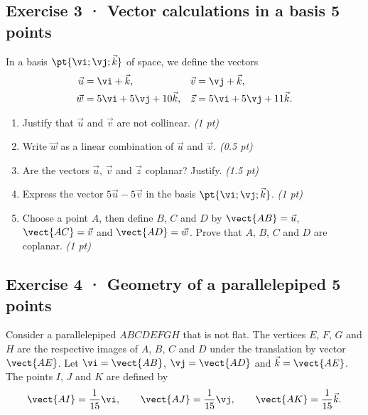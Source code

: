 \mxnewpage{}

\subsection*{Exercise 3 · Vector calculations in a basis \hfill 5 points}In a basis $\pt{\vi;\vj;\vec k}$ of space, we define the vectors
\[\begin{aligned}\vec u&=\vi+\vec k,&\vec v&=\vj+\vec k,\\
\vec w&=5\vi+5\vj+10\vec k,&\vec z&=5\vi+5\vj+11\vec k.\end{aligned}\]

\begin{enumerate}

\item Justify that $\vec u$ and $\vec v$ are not collinear. \hfill\textit{(1 pt)}

\item Write $\vec w$ as a linear combination of $\vec u$ and $\vec v$. \hfill\textit{(0.5 pt)}

\item Are the vectors $\vec u$, $\vec v$ and $\vec z$ coplanar? Justify. \hfill\textit{(1.5 pt)}

\item Express the vector $5\vec u-5\vec v$ in the basis $\pt{\vi;\vj;\vec k}$. \hfill\textit{(1 pt)}

\item Choose a point $A$, then define $B$, $C$ and $D$ by $\vect{AB}=\vec u$, $\vect{AC}=\vec v$ and $\vect{AD}=\vec w$. Prove that $A$, $B$, $C$ and $D$ are coplanar. \hfill\textit{(1 pt)}

\end{enumerate}

\subsection*{Exercise 4 · Geometry of a parallelepiped \hfill 5 points}Consider a parallelepiped $ABCDEFGH$ that is not flat. The vertices $E$, $F$, $G$ and $H$ are the respective images of $A$, $B$, $C$ and $D$ under the translation by vector $\vect{AE}$.
Let $\vi=\vect{AB}$, $\vj=\vect{AD}$ and $\vec k=\vect{AE}$.
The points $I$, $J$ and $K$ are defined by
\[\vect{AI}=\frac1{15}\vi,\qquad\vect{AJ}=\frac1{15}\vj,\qquad\vect{AK}=\frac1{15}\vec k.\]

